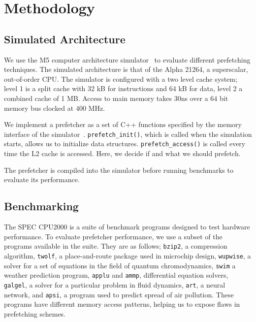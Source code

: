 \section{Methodology}
\label{sec:methodology}

\subsection{Simulated Architecture}

We use the M5 computer architecture simulator~\cite{bib:m5} to evaluate different prefetching techniques.
The simulated architecture is that of the Alpha 21264\cite{bib:alpha-21264}, a superscalar, out-of-order CPU.
The simulator is configured with a two level cache system; level 1 is a split cache with 32 kB for instructions and 64 kB for data, level 2 a combined cache of 1 MB.
Access to main memory takes $30$ns over a $64$ bit memory bus clocked at $400$ MHz.

We implement a prefetcher as a set of C++ functions specified by the memory interface of the simulator~\cite[Section 3.2]{bib:doc}.
\texttt{prefetch\_init()}, which is called when the simulation starts, allows us to initialize data structures.
\texttt{prefetch\_access()} is called every time the L2 cache is accessed.
Here, we decide if and what we should prefetch.

The prefetcher is compiled into the simulator before running benchmarks to evaluate its performance.

\subsection{Benchmarking}

The SPEC CPU2000\cite{bib:cpu2000} is a suite of benchmark programs designed to test hardware performance.
To evaluate prefetcher performance, we use a subset of the programs available in the suite.
They are as follows; \texttt{bzip2}, a compression algorithm, \texttt{twolf},
a place-and-route package used in microchip design, \texttt{wupwise}, a solver for a set of
equations in the field of quantum chromodynamics, \texttt{swim} a weather prediction program,
\texttt{applu} and \texttt{ammp}, differential equation solvers, \texttt{galgel}, a solver for a
particular problem in fluid dynamics, \texttt{art}, a neural network, and \texttt{apsi}, a program used to predict spread of air pollution.
These programs have different memory access patterns, helping us to expose flaws in prefetching schemes.

